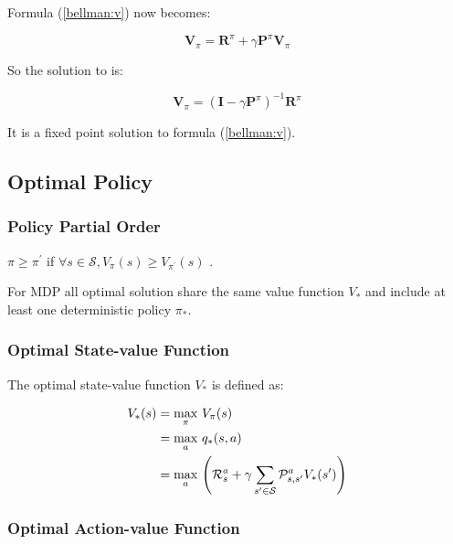 Formula (\ref{bellman:v}) now becomes:

\begin{equation}
	\mathbf{V}_{\pi}=\mathbf{R}^{\pi} + \gamma \mathbf{P}^{\pi} \mathbf{V}_{\pi} 
\end{equation}

So the solution to  is:

\begin{equation}
	\mathbf{V}_{\pi}=(\mathbf{I} - \gamma \mathbf{P}^{\pi})^{-1}\mathbf{R}^{\pi}
\end{equation}

It is a fixed point solution to formula (\ref{bellman:v}).

\subsection{Optimal Policy}

\subsubsection{Policy Partial Order}

$\pi \geq \pi^{\prime}$ if $\forall s \in \mathcal{S}, V_{\pi} (s) \geq V_{\pi^{\prime}} (s)$ . 


For MDP all optimal solution share the same value function $V_*$ and include at least one deterministic policy $\pi_*$. 


\subsubsection{Optimal State-value Function}

The optimal state-value function $V_*$ is defined as:


\begin{equation}
	\begin{aligned}
		V_*(s) &= \underset{\pi}{\max} \ V_{\pi}(s) \\
		&= \underset{a}{\max}\ q_* (s, a) \\
		&= \underset{a}{\max}\ \mleft( \mathcal{R}_s^a + \gamma \sum_{s' \in \mathcal{S}} \mathcal{P}_{s,s'}^a V_*(s') \mright )
	\end{aligned}
\end{equation}

\subsubsection{Optimal Action-value Function}


